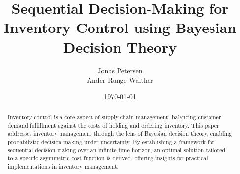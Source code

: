 \documentclass[a4paper,12pt]{article}
\title{Sequential Decision-Making for Inventory Control using Bayesian Decision Theory}
\author{Jonas Petersen \\ Ander Runge Walther }
\date{\today}
\begin{document}
	\maketitle
	
	\begin{abstract}
		Inventory control is a core aspect of supply chain management, balancing customer demand fulfillment against the costs of holding and ordering inventory. This paper addresses inventory management through the lens of Bayesian decision theory, enabling probabilistic decision-making under uncertainty. By establishing a framework for sequential decision-making over an infinite time horizon, an optimal solution tailored to a specific asymmetric cost function is derived, offering insights for practical implementations in inventory management.
	\end{abstract}
	
	
	
	
	
	
	\newpage
	\begin{appendices}
		
		
		
	\end{appendices}
	
	
	
	
	
\end{document}
